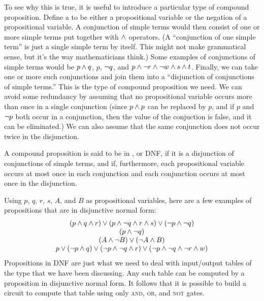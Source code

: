 To see why this is true, it is useful to introduce a particular type
of compound proposition.  Define a  to be either
a propositional variable or the negation of a propositional variable.
A conjunction of simple terms would then consist of one or more
simple terms put together with $\wedge$ operators.  (A ``conjunction of
one simple term'' is just a single simple term by itself.  This might
not make grammatical sense, but it's the way mathematicians think.)
Some examples of conjunctions of simple terms would be
$p\wedge q$, $p$, $\lnot q$, and $p\wedge\lnot r\wedge \lnot w\wedge s\wedge t$.
Finally, we can take one or more such conjunctions and join them
into a ``disjunction of conjunctions of simple terms.''  This is the
type of compound proposition we need.  We can avoid some redundancy
by assuming that no propositional variable occurs more than once
in a single conjunction (since $p\wedge p$ can be replaced by $p$,
and if $p$ and $\lnot p$ both occur in a conjunction, then the value
of the conjuction is false, and it can be eliminated.)  We can also
assume that the same conjunction does not occur twice in the
disjunction.
\begin{definition}\label{D-DNF}
A compound proposition is said to be in ,
or DNF, if it is a disjunction of conjunctions of simple terms,
and if, furthermore, each propositional variable occurs at most once
in each conjunction and each conjunction occurs at most once in the
disjunction.
\end{definition}
Using $p$, $q$, $r$, $s$, $A$, and $B$ as propositional variables,
here are a few examples of propositions that are in disjunctive
normal form:
\[
\begin{array}{c}
(p\wedge q\wedge r)\vee(p\wedge\lnot q\wedge r\wedge s)\vee(\lnot p\wedge\lnot q)\\
(p\wedge \lnot q)\\
(A\wedge \lnot B)\vee(\lnot A\wedge B)\\
p\vee(\lnot p\wedge q)\vee(\lnot p\wedge\lnot q\wedge r)\vee(\lnot p\wedge\lnot q\wedge\lnot r\wedge w)\\
\end{array}
\]
Propositions in DNF are just what we need to deal with input/output
tables of the type that we have been discussing.  Any such table
can be computed by a proposition in disjunctive normal form.
It follows that it is  possible to build a circuit to compute that 
table using only \textsc{and}, \textsc{or}, and \textsc{not} gates.

